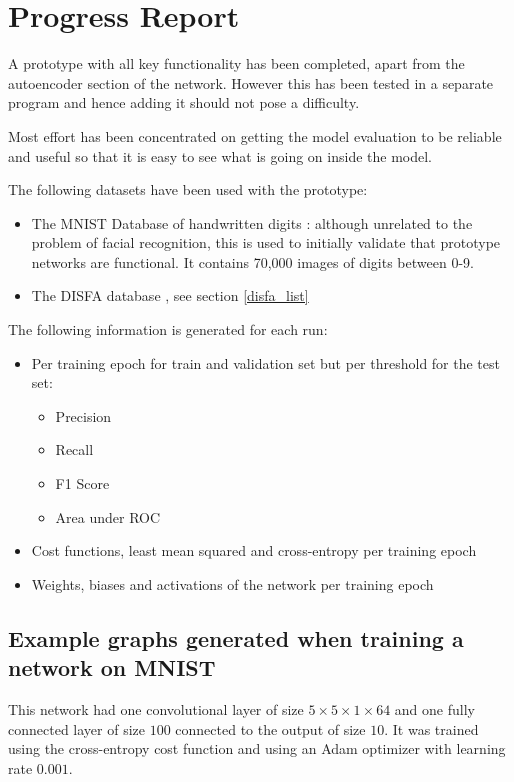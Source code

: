 \documentclass[9pt]{article} \usepackage{amsmath, amsthm, amssymb}
\begin{document}
%
%
%
\newpage
\section{Progress Report}
%
%
%
A prototype with all key functionality has been completed, apart from
the autoencoder section of the network. However this has been tested
in a separate program and hence adding it should not pose a difficulty.

Most effort has been concentrated on getting the model evaluation
to be reliable and useful so that it is easy to see what is going on
inside the model.

The following datasets have been used with the prototype:
\begin{itemize}
 \item The MNIST Database of handwritten digits \cite{mnist} : although
       unrelated to the problem of facial recognition, this is used to initially
       validate that prototype networks are functional. It contains 70,000 images of
       digits between 0-9.
    \item The DISFA database \cite{disfa}, see section \ref{disfa_list}
\end{itemize}

The following information is generated for each run:
\begin{itemize}
    \item Per training epoch for train and validation set but per threshold for the test set:
            \begin{itemize}
                \item Precision
                \item Recall
                \item F1 Score
                \item Area under ROC
            \end{itemize}
  \item Cost functions, least mean squared and cross-entropy per training epoch
  \item Weights, biases and activations of the network per training epoch
\end{itemize}

\subsection{Example graphs generated when training a network on MNIST}

This network had one convolutional layer of size $5\times5\times1\times64$ and one
fully connected layer of size $100$ connected to the output of size $10$. It was
trained using the cross-entropy cost function and using an Adam optimizer\cite{adam} with learning rate $0.001$.
\end{document}
